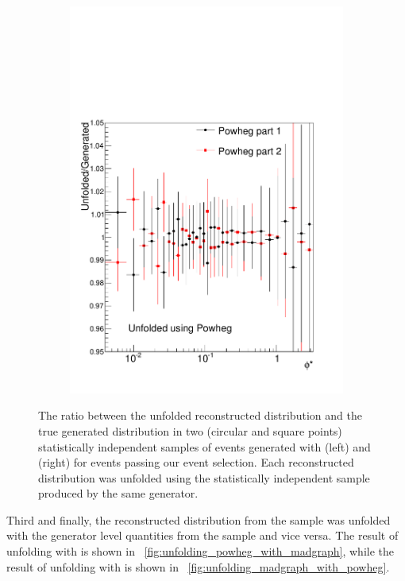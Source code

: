 \begin{figure}[!htbp]
\begin{subfigure}[b]{\SideBySidePlotWidth}
        \includegraphics[width=\textwidth]{figures/BinM_P1P2.pdf}
        \caption{}
        \label{fig:unfolding_powheg_with_powheg_halves}
    \end{subfigure}
    \caption{
        The ratio between the unfolded reconstructed \phistar distribution and
        the true generated \phistar distribution in two (circular and square
        points) statistically independent samples of \Ztoee events generated
        with \MADGRAPH (left) and \POWHEG (right) for events passing our event
        selection. Each reconstructed \phistar distribution was unfolded using
        the statistically independent sample produced by the same generator.
    }
    \label{fig:half_vs_half_unfolding}
\end{figure}

Third and finally, the reconstructed \phistar distribution from the \MADGRAPH
sample was unfolded with the generator level quantities from the \POWHEG sample
and vice versa. The result of unfolding \POWHEG with \MADGRAPH is shown in
\FIG~\ref{fig:unfolding_powheg_with_madgraph}, while the result of unfolding
\MADGRAPH with \POWHEG is shown in
\FIG~\ref{fig:unfolding_madgraph_with_powheg}.

